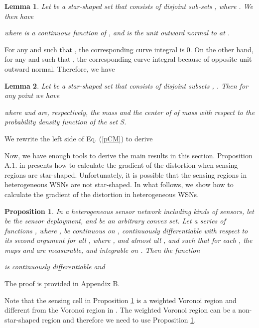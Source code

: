 \documentclass[journal,draftcls,onecolumn,12pt,twoside, narroweqnarray]{IEEEtran}
\newtheorem{prop}{Proposition}
\newtheorem{Lemma}{Lemma}
\begin{document}
\begin{Lemma}
\label{Lamma2}
Let  be a star-shaped set that consists of  disjoint sub-sets , where . We then have

where  is a continuous function of , and  is the unit outward normal to  at .
\end{Lemma}
\begin{IEEEproof}

For any  and  such that , the corresponding curve integral  is 0. On the other hand, for any  and  such that , the corresponding curve integral  because of opposite unit outward normal. Therefore, we have

\end{IEEEproof}
\begin{Lemma}
\label{Lamma3}
Let  be a star-shaped set that consists of  disjoint subsets , . Then for any point  we have

where  and  are, respectively, the mass and the center of of mass with respect to the probability density function  of the set S.
\end{Lemma}
\begin{IEEEproof}
We rewrite the left side of Eq. (\ref{pCM}) to derive

\end{IEEEproof}
Now, we have enough tools to derive the main results in this section.
Proposition A.1. in \cite{SD} presents how to calculate the gradient of the distortion when sensing regions are star-shaped. Unfortunately, it is possible that the sensing regions in heterogeneous WSNs are not star-shaped. In what follows, we show how to calculate the gradient of the distortion in heterogeneous WSNs.
\begin{prop}
\label{prop2}
In a heterogeneous sensor network including  kinds of sensors, let  be the sensor deployment, and  be an arbitrary convex set. Let a series of functions , where , be continuous on , continuously differentiable with respect to its second argument for all , where , and almost all , and such that for each , the maps  and  are measurable, and integrable on . Then the function

is continuously differentiable and

\end{prop}
\begin{IEEEproof}
The proof is provided in Appendix B.
\end{IEEEproof}
Note that the sensing cell  in Proposition \ref{prop2} is a weighted Voronoi region and different from the Voronoi region in \cite{SD}. The weighted Voronoi region  can be a non-star-shaped region and therefore we need to use Proposition \ref{prop2}.
\end{document}
